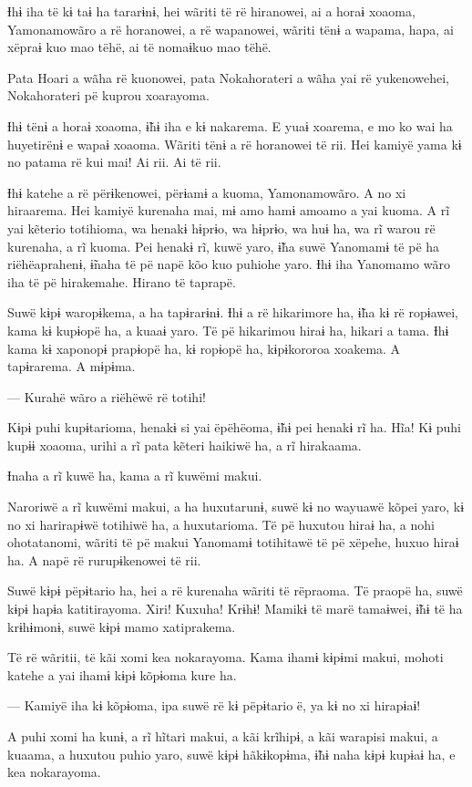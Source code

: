 Ɨhɨ iha të kɨ taɨ ha tararɨnɨ, hei wãriti të rë hiranowei, ai a horaɨ
xoaoma, Yamonamowãro a rë horanowei, a rë wapanowei, wãriti tënɨ a
wapama, hapa, ai xëpraɨ kuo mao tëhë, ai të nomaɨkuo mao tëhë. 

Pata Hoari a wãha rë kuonowei, pata Nokahorateri a wãha yai rë
yukenowehei, Nokahorateri pë kuprou xoarayoma. 

Ɨhɨ tënɨ a horaɨ xoaoma, ɨ̃hɨ iha e kɨ nakarema. E yuaɨ xoarema, e mo ko
wai ha huyetirënɨ e wapaɨ xoaoma. Wãriti tënɨ a rë horanowei të rii. Hei
kamiyë yama kɨ no patama rë kui mai! Ai rii. Ai të rii. 

Ɨhɨ katehe a rë përɨkenowei, përɨamɨ a kuoma, Yamonamowãro. A no xi
hiraarema. Hei kamiyë kurenaha mai, mɨ amo hamɨ amoamo a yai kuoma. A rĩ
yai kẽterio totihioma, wa henakɨ hɨprɨo, wa hɨprɨo, wa huɨ ha, wa rĩ
warou rë kurenaha, a rĩ kuoma. Pei henakɨ rĩ, kuwë yaro, ɨ̃ha suwë
Yanomamɨ të pë ha riëhëaprahenɨ, ɨ̃naha të pë napë kõo kuo puhiohe yaro.
Ɨhɨ iha Yanomamo wãro iha të pë hirakemahe. Hirano të taprapë. 

Suwë kɨpɨ waropɨkema, a ha tapɨrarɨnɨ. Ɨhɨ a rë hikarimore ha, ɨ̃ha kɨ rë
ropɨawei, kama kɨ kupɨopë ha, a kuaaɨ yaro. Të pë hikarimou hiraɨ ha,
hikari a tama. Ɨhɨ kama kɨ xaponopɨ prapɨopë ha, kɨ ropɨopë ha,
kɨpɨkororoa xoakema. A tapɨrarema. A mɨpɨma. 

--- Kurahë wãro a riëhëwë rë totihi! 

Kɨpɨ puhi kupɨtarioma, henakɨ si yai ëpëhëoma, ɨ̃hɨ pei henakɨ rĩ ha.
Hĩa! Kɨ puhi kupɨɨ xoaoma, urihi a rĩ pata kẽteri haikiwë ha, a rĩ
hirakaama. 

Ɨnaha a rĩ kuwë ha, kama a rĩ kuwëmi makui. 

Naroriwë a rĩ kuwëmi makui, a ha huxutarunɨ, suwë kɨ no wayuawë kõpei
yaro, kɨ no xi harirapɨwë totihiwë ha, a huxutarioma. Të pë huxutou
hiraɨ ha, a nohi ohotatanomi, wãriti të pë makui Yanomamɨ totihitawë të
pë xëpehe, huxuo hiraɨ ha. A napë rë rurupɨkenowei të rii. 

Suwë kɨpɨ pëpɨtario ha, hei a rë kurenaha wãriti të rëpraoma. Të praopë
ha, suwë kɨpɨ hapɨa katitirayoma. Xiri! Kuxuha! Krɨhɨ! Mamikɨ të marë
tamaɨwei, ɨ̃hɨ të ha krɨhɨmonɨ, suwë kɨpɨ mamo xatiprakema. 

Të rë wãritii, të kãi xomi kea nokarayoma. Kama ihamɨ kɨpɨmi makui,
mohoti katehe a yai ihamɨ kɨpɨ kõpɨoma kure ha. 

--- Kamiyë iha kɨ kõpɨoma, ipa suwë rë kɨ pëpɨtario ë, ya kɨ no xi
hirapɨaɨ! 

A puhi xomi ha kunɨ, a rĩ hĩtari makui, a kãi krĩhipɨ, a kãi warapisi
makui, a kuaama, a huxutou puhio yaro, suwë kɨpɨ hãkɨkopɨma, ɨ̃hɨ naha
kɨpɨ kupɨaɨ ha, e kea nokarayoma. 

